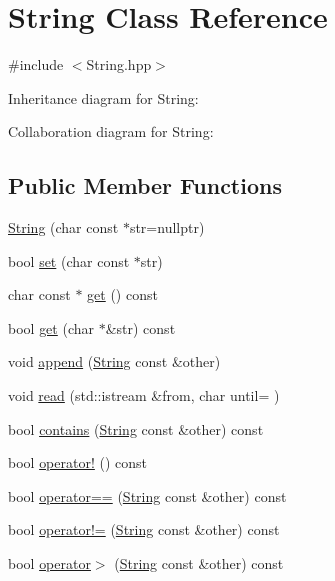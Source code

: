 \hypertarget{classString}{}\section{String Class Reference}
\label{classString}


{\ttfamily \#include $<$String.\+hpp$>$}



Inheritance diagram for String\+:


Collaboration diagram for String\+:
\subsection*{Public Member Functions}
\begin{DoxyCompactItemize}
\item 
\hyperlink{classString_a33582c77a4e6b03f950082593cc57de4}{String} (char const $\ast$str=nullptr)
\item 
bool \hyperlink{classString_a809addfc91485db4c89baad03ff12b18}{set} (char const $\ast$str)
\item 
char const  $\ast$ \hyperlink{classString_ac7459c7a9d75bdcc53d44a0c5ec7a182}{get} () const
\item 
bool \hyperlink{classString_ad11aaf7841686006dd6840a5fab5664e}{get} (char $\ast$\&str) const
\item 
void \hyperlink{classString_a8a191fafb7af689d86f50423e97e60d7}{append} (\hyperlink{classString}{String} const \&other)
\item 
void \hyperlink{classString_ab0c13e38cf91f55bb6eaedd513f124db}{read} (std\+::istream \&from, char until=\textquotesingle{} \textquotesingle{})
\item 
bool \hyperlink{classString_a16b809e6c0a80889b2ee8e753003ab70}{contains} (\hyperlink{classString}{String} const \&other) const
\item 
bool \hyperlink{classString_a3a8304a7fe06a23f1750629a9186d346}{operator!} () const
\item 
bool \hyperlink{classString_a2525ca0e0fd8e1a63d947f39ebc5e4d0}{operator==} (\hyperlink{classString}{String} const \&other) const
\item 
bool \hyperlink{classString_abfb25af8317420d71b0d54603d049383}{operator!=} (\hyperlink{classString}{String} const \&other) const
\item 
bool \hyperlink{classString_a4b9b4c9eab5759a848229a8209ac3ddf}{operator$>$} (\hyperlink{classString}{String} const \&other) const
\item 

\end{DoxyCompactItemize}
